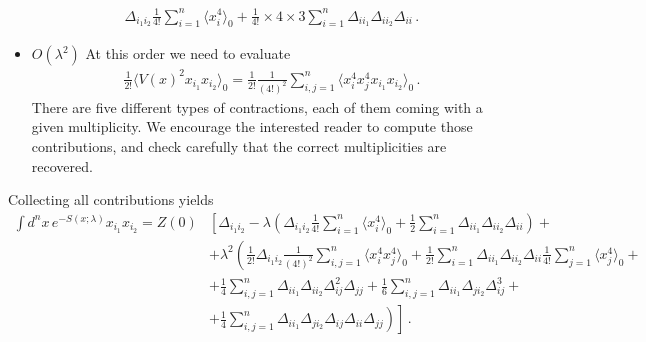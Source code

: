 \documentclass[notes.tex]{subfiles}
\begin{document}
\begin{itemize}
\begin{align}
    \Delta_{i_1 i_2} \frac{1}{4!} \sum_{i=1}^n \langle x_i^4\rangle_0
    + \frac{1}{4!} \times 4 \times 3 \sum_{i=1}^n \Delta_{i i_1}
    \Delta_{i i_2} \Delta_{i i} \, .
  \end{align}
\item $O(\lambda^2)$ At this order we need to evaluate
  \begin{align}
    \frac{1}{2!} \langle V(x)^2 x_{i_1} x_{i_2} \rangle_0 = 
    \frac{1}{2!} \frac{1}{(4!)^2} \sum_{i,j=1}^n \langle x_i^4 x_j^4
    x_{i_1} x_{i_2} \rangle_0\, .
  \end{align}
  There are five different types of contractions, each of them coming
  with a given multiplicity. We encourage the interested reader to
  compute those contributions, and check carefully that the correct
  multiplicities are recovered. 
\end{itemize}
Collecting all contributions yields
\begin{align}
  \int d^nx\, e^{-S(x;\lambda)} 
  x_{i_1} x_{i_2} = Z(0) & 
                           \left[
                           \Delta_{i_1 i_2} - \lambda \left(\Delta_{i_1 i_2}
                           \frac{1}{4!} \sum_{i=1}^n \langle
                           x_i^4\rangle_0 +  \frac12 \sum_{i=1}^n
                           \Delta_{i i_1} \Delta_{i i_2} \Delta_{i i} 
                           \right) + \right. \nonumber \\
                         & \left.
                           + \lambda^2 \left( 
                           \frac{1}{2!} \Delta_{i_1 i_2} \frac{1}{(4!)^2}
                           \sum_{i,j=1}^n \langle x_i^4 x_j^4 \rangle_0
                           + \frac{1}{2!} \sum_{i=1}^n \Delta_{i i_1}
                           \Delta_{i i_2} \Delta_{i i}  \frac{1}{4!}
                           \sum_{j=1}^n \langle x_j^4 \rangle_0
                           + \right. \right. \nonumber \\
                         & + \left. \left.
                           \frac{1}{4} \sum_{i,j=1}^n \Delta_{i i_1}
                           \Delta_{i i_2} \Delta_{i j}^2 \Delta_{jj}
                           + \frac{1}{6} \sum_{i,j=1}^n \Delta_{i i_1}
                           \Delta_{j i_2} \Delta_{i j}^3 +
                           \right. \right. \nonumber \\
  \label{eq:TwoPointNotNorm}
                         & + \left. \left.
                           \frac{1}{4} \sum_{i,j=1}^n \Delta_{i i_1}
                           \Delta_{j i_2} \Delta_{i j} \Delta_{ii}\Delta_{jj}
                           \right)
                           \right]\, .
\end{align}
\end{document}
